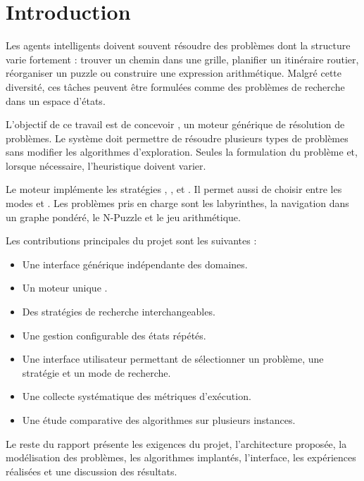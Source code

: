 \section{Introduction}

Les agents intelligents doivent souvent résoudre des problèmes dont la structure
varie fortement : trouver un chemin dans une grille, planifier un itinéraire
routier, réorganiser un puzzle ou construire une expression arithmétique.
Malgré cette diversité, ces tâches peuvent être formulées comme des problèmes
de recherche dans un espace d'états.

L'objectif de ce travail est de concevoir \AUSSI{}, un moteur générique de
résolution de problèmes. Le système doit permettre de résoudre plusieurs types
de problèmes sans modifier les algorithmes d'exploration. Seules la formulation
du problème et, lorsque nécessaire, l'heuristique doivent varier.

Le moteur implémente les stratégies \BFS{}, \UCS{}, \Greedy{} et \AStar{}.
Il permet aussi de choisir entre les modes \TreeSearch{} et \GraphSearch{}.
Les problèmes pris en charge sont les labyrinthes, la navigation dans un graphe
pondéré, le N-Puzzle et le jeu arithmétique.

Les contributions principales du projet sont les suivantes :

\begin{itemize}
    \item Une interface générique  indépendante des domaines.
    \item Un moteur unique .
    \item Des stratégies de recherche interchangeables.
    \item Une gestion configurable des états répétés.
    \item Une interface utilisateur permettant de sélectionner un problème,
    une stratégie et un mode de recherche.
    \item Une collecte systématique des métriques d'exécution.
    \item Une étude comparative des algorithmes sur plusieurs instances.
\end{itemize}

Le reste du rapport présente les exigences du projet, l'architecture proposée,
la modélisation des problèmes, les algorithmes implantés, l'interface, les
expériences réalisées et une discussion des résultats.